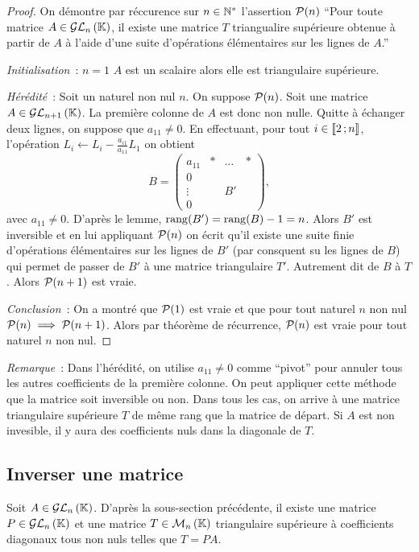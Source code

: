 \begin{proof}
  On démontre par réccurence sur \(n \in \N^*\) l'assertion \(\P(n)\) ``Pour toute matrice \(A \in \GLn{n}{\K}\), il existe une matrice \(T\) triangualire supérieure obtenue à partir de \(A\) à l'aide d'une suite d'opérations élémentaires sur les lignes de \(A\).''

\emph{Initialisation}~: \(n=1\) \(A\) est un scalaire alors elle est triangulaire supérieure.

\emph{Hérédité}~: Soit un naturel non nul \(n\). On suppose \(\P(n)\). Soit une matrice \(A \in \GLn{n+1}{\K}\). La première colonne de \(A\) est donc non nulle. Quitte à échanger deux lignes, on suppose que \(a_{11}\neq 0\). En effectuant, pour tout \(i \in \intervalleentier{2}{n}\), l'opération \(L_i \leftarrow L_i -\frac{a_{i1}}{a_{11}}L_1\) on obtient
\begin{equation}
  B = \begin{pmatrix}
      a_{11} & * & \ldots & * \\
      0 & & & \\
      \vdots & & B' & \\
      0 & & & 
    \end{pmatrix},
\end{equation}
avec \(a_{11}\neq 0\). D'après le lemme, \(\rg(B')=\rg(B)-1=n\). Alors \(B'\) est inversible et en lui appliquant \(\P(n)\) on écrit qu'il existe une suite finie d'opérations élémentaires sur les lignes de \(B'\) (par consquent su les lignes de \(B\)) qui permet de passer de \(B'\) à une matrice triangulaire \(T'\). Autrement dit de \(B\) à \(T\). Alors \(\P(n+1)\) est vraie.

\emph{Conclusion}~: On a montré que \(\P(1)\) est vraie et que pour tout naturel \(n\) non nul \(\P(n) \implies \P(n+1)\). Alors par théorème de récurrence, \(\P(n)\) est vraie pour tout naturel \(n\) non nul.
\end{proof}

\emph{Remarque}~: Dans l'hérédité, on utilise \(a_{11}\neq 0\) comme ``pivot'' pour annuler tous les autres coefficients de la première colonne. On peut appliquer cette méthode que la matrice soit inversible ou non. Dans tous les cas, on arrive à  une matrice triangulaire supérieure \(T\) de même rang que la matrice de départ. Si \(A\) est non invesible, il y aura des coefficients nuls dans la diagonale de \(T\).

\subsection{Inverser une matrice}
Soit \(A \in \GLn{n}{\K}\). D'après la sous-section précédente, il existe une matrice \(P \in \GLn{n}{\K}\) et une matrice \(T \in \Mn{n}{\K}\) triangulaire supérieure à coefficients diagonaux tous non nuls telles que \(T=PA\).

